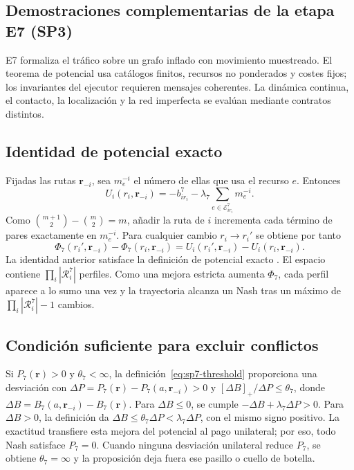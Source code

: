\subsection{Demostraciones complementarias de la etapa E7 (SP3)}
\label{app:sp7-proofs}

E7 formaliza el tráfico sobre un grafo inflado con movimiento muestreado. El teorema de potencial usa catálogos finitos, recursos no ponderados y costes fijos; los invariantes del ejecutor requieren mensajes coherentes. La dinámica continua, el contacto, la localización y la red imperfecta se evalúan mediante contratos distintos.

\subsection{Identidad de potencial exacto}
\label{app:sp7-potential-proof}

Fijadas las rutas $\boldsymbol r_{-i}$, sea $m_e^{-i}$ el número de ellas que usa el recurso $e$. Entonces
\[
 U_i(r_i,\boldsymbol r_{-i})=-b_{ir_i}^7-\lambda_7\sum_{e\in\mathcal E_{ir_i}^7}m_e^{-i}.
\]
Como $\binom{m+1}{2}-\binom m2=m$, añadir la ruta de $i$ incrementa cada término de pares exactamente en $m_e^{-i}$. Para cualquier cambio $r_i\to r_i'$ se obtiene por tanto
\[
 \Phi_7(r_i',\boldsymbol r_{-i})-\Phi_7(r_i,\boldsymbol r_{-i})
 =U_i(r_i',\boldsymbol r_{-i})-U_i(r_i,\boldsymbol r_{-i}).
\]
La identidad anterior satisface la definición de potencial exacto \parencite{monderer1996potential}. El espacio contiene \(\prod_i|\mathcal R_i^7|\) perfiles. Como una mejora estricta aumenta \(\Phi_7\), cada perfil aparece a lo sumo una vez y la trayectoria alcanza un Nash tras un máximo de \(\prod_i|\mathcal R_i^7|-1\) cambios.

\subsection{Condición suficiente para excluir conflictos}
\label{app:sp7-conflict-free-proof}

Si $P_7(\boldsymbol r)>0$ y $\theta_7<\infty$, la definición~\eqref{eq:sp7-threshold} proporciona una desviación con $\Delta P=P_7(\boldsymbol r)-P_7(a,\boldsymbol r_{-i})>0$ y $[\Delta B]_+/\Delta P\leq\theta_7$, donde $\Delta B=B_7(a,\boldsymbol r_{-i})-B_7(\boldsymbol r)$. Para \(\Delta B\leq0\), se cumple \(-\Delta B+\lambda_7\Delta P>0\). Para \(\Delta B>0\), la definición da \(\Delta B\leq\theta_7\Delta P<\lambda_7\Delta P\), con el mismo signo positivo. La exactitud transfiere esta mejora del potencial al pago unilateral; por eso, todo Nash satisface \(P_7=0\). Cuando ninguna desviación unilateral reduce \(P_7\), se obtiene \(\theta_7=\infty\) y la proposición deja fuera ese pasillo o cuello de botella.

